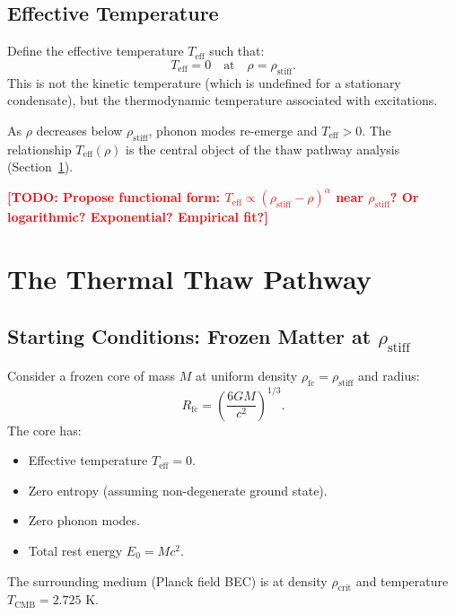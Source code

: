 \documentclass[11pt,a4paper]{article}
\newcommand{\rhocrit}{\ensuremath{\rho_{\mathrm{crit}}}}
\newcommand{\rhostiff}{\ensuremath{\rho_{\mathrm{stiff}}}}
\newcommand{\Teff}{\ensuremath{T_{\mathrm{eff}}}}
\newcommand{\TCMB}{\ensuremath{T_{\mathrm{CMB}}}}
\newcommand{\Rfc}{\ensuremath{R_{\mathrm{fc}}}}
\newcommand{\rhofc}{\ensuremath{\rho_{\mathrm{fc}}}}
\newcommand{\TODO}[1]{\textcolor{red}{\textbf{[TODO: #1]}}}
\theoremstyle{definition}
\theoremstyle{remark}
\begin{document}
\subsection{Effective Temperature}
\label{sec:effective_temperature}

Define the effective temperature $\Teff$ such that:
\begin{equation}
\Teff = 0 \quad \text{at} \quad \rho = \rhostiff.
\end{equation}
This is not the kinetic temperature (which is undefined for a stationary condensate), but the thermodynamic temperature associated with excitations.

As $\rho$ decreases below $\rhostiff$, phonon modes re-emerge and $\Teff > 0$. The relationship $\Teff(\rho)$ is the central object of the thaw pathway analysis (Section~\ref{sec:thaw_pathway}).

\TODO{Propose functional form: $\Teff \propto (\rhostiff - \rho)^\alpha$ near $\rhostiff$? Or logarithmic? Exponential? Empirical fit?}

\section{The Thermal Thaw Pathway}
\label{sec:thaw_pathway}

\subsection{Starting Conditions: Frozen Matter at $\rhostiff$}
\label{sec:starting_conditions}

Consider a frozen core of mass $M$ at uniform density $\rhofc = \rhostiff$ and radius:
\begin{equation}
\Rfc = \left( \frac{6GM}{c^2} \right)^{1/3}.
\end{equation}
The core has:
\begin{itemize}[leftmargin=*, itemsep=0.3em]
\item Effective temperature $\Teff = 0$.
\item Zero entropy (assuming non-degenerate ground state).
\item Zero phonon modes.
\item Total rest energy $E_0 = Mc^2$.
\end{itemize}

The surrounding medium (Planck field BEC) is at density $\rhocrit$ and temperature $\TCMB = 2.725$ K.
\end{document}
